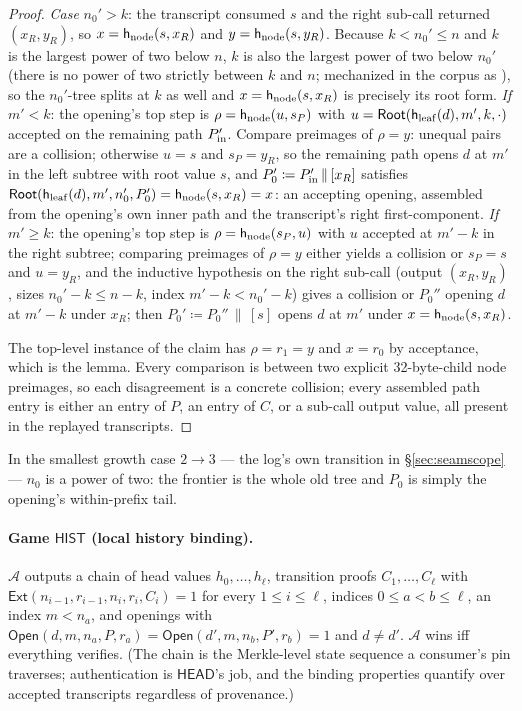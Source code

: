\documentclass[11pt]{article}
\theoremstyle{remark}
\newcommand{\hleaf}{\mathsf{h}_{\rm leaf}}
\newcommand{\hnode}{\mathsf{h}_{\rm node}}
\newcommand{\Root}{\mathsf{Root}}
\newcommand{\code}[1]{\texttt{\detokenize{#1}}}
\begin{document}
\begin{proof}
\emph{Case} $n_0'>k$: the transcript consumed $s$ and the right sub-call
returned $(x_R,y_R)$, so $x=\hnode(s,x_R)$ and $y=\hnode(s,y_R)$. Because
$k<n_0'\le n$ and $k$ is the largest power of two below $n$, $k$ is also the
largest power of two below $n_0'$ (there is no power of two strictly between
$k$ and $n$; mechanized in the corpus as \code{kbelow_prefix_eq}), so the $n_0'$-tree splits at $k$ as well and
$x=\hnode(s,x_R)$ is precisely its root form.
\emph{If} $m'<k$: the opening's top step is $\rho=\hnode(u,s_P)$ with
$u=\Root(\hleaf(d),m',k,\cdot)$ accepted on the remaining path
$P'_{\rm in}$. Compare preimages of $\rho=y$: unequal pairs are a collision;
otherwise $u=s$ and $s_P=y_R$, so the remaining path opens $d$ at $m'$ in the
left subtree with root value $s$, and
$P_0'\coloneqq P'_{\rm in}\,\|\,[x_R]$ satisfies
$\Root(\hleaf(d),m',n_0',P_0')=\hnode(s,x_R)=x$: an accepting opening,
assembled from the opening's own inner path and the transcript's right
first-component. \emph{If} $m'\ge k$: the opening's top step is
$\rho=\hnode(s_P,u)$ with $u$ accepted at $m'-k$ in the right subtree;
comparing preimages of $\rho=y$ either yields a collision or $s_P=s$ and
$u=y_R$, and the inductive hypothesis on the right sub-call (output
$(x_R,y_R)$, sizes $n_0'-k\le n-k$, index $m'-k<n_0'-k$) gives a collision or
$P_0''$ opening $d$ at $m'-k$ under $x_R$; then
$P_0'\coloneqq P_0''\,\|\,[s]$ opens $d$ at $m'$ under $x=\hnode(s,x_R)$.

The top-level instance of the claim has $\rho=r_1=y$ and $x=r_0$ by
acceptance, which is the lemma. Every comparison is between two explicit
32-byte-child node preimages, so each disagreement is a concrete collision;
every assembled path entry is either an entry of $P$, an entry of $C$, or a
sub-call output value, all present in the replayed transcripts.
\end{proof}

In the smallest growth case $2\to3$ --- the log's own transition in
\S\ref{sec:seamscope} --- $n_0$ is a power of two: the frontier is the whole
old tree and $P_0$ is simply the opening's within-prefix tail.

\paragraph{Game $\mathsf{HIST}$ (local history binding).}
$\mathcal{A}$ outputs a chain of head values $h_0,\dots,h_\ell$, transition
proofs $C_1,\dots,C_\ell$ with $\mathsf{Ext}(n_{i-1},r_{i-1},n_i,r_i,C_i)=1$
for every $1\le i\le \ell$, indices $0\le a<b\le \ell$, an index $m<n_a$, and
openings with
$\mathsf{Open}(d,m,n_a,P,r_a)=\mathsf{Open}(d',m,n_b,P',r_b)=1$ and
$d\neq d'$. $\mathcal{A}$ wins iff everything verifies. (The chain is the
Merkle-level state sequence a consumer's pin traverses; authentication is
$\mathsf{HEAD}$'s job, and the binding properties quantify over accepted
transcripts regardless of provenance.)
\end{document}
